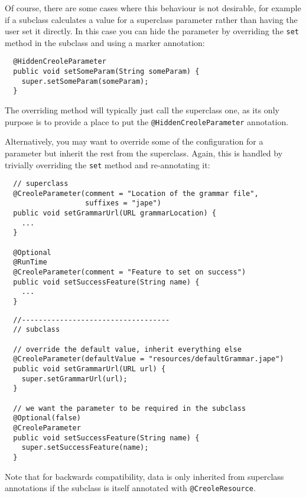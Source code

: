 Of course, there are some cases where this behaviour is not desirable, for
example if a subclass calculates a value for a superclass parameter rather than
having the user set it directly.  In this case you can hide the parameter by
overriding the {\tt set} method in the subclass and using a marker annotation:
\begin{lstlisting}
  @HiddenCreoleParameter
  public void setSomeParam(String someParam) {
    super.setSomeParam(someParam);
  }
\end{lstlisting}

The overriding method will typically just call the superclass one, as its only
purpose is to provide a place to put the \verb|@HiddenCreoleParameter|
annotation.

Alternatively, you may want to override some of the configuration for a
parameter but inherit the rest from the superclass.  Again, this is handled by
trivially overriding the {\tt set} method and re-annotating it:
\begin{lstlisting}
  // superclass
  @CreoleParameter(comment = "Location of the grammar file",
                   suffixes = "jape")
  public void setGrammarUrl(URL grammarLocation) {
    ...
  }

  @Optional
  @RunTime
  @CreoleParameter(comment = "Feature to set on success")
  public void setSuccessFeature(String name) {
    ...
  }
\end{lstlisting}
\begin{lstlisting}
  //-----------------------------------
  // subclass
  
  // override the default value, inherit everything else
  @CreoleParameter(defaultValue = "resources/defaultGrammar.jape")
  public void setGrammarUrl(URL url) {
    super.setGrammarUrl(url);
  }

  // we want the parameter to be required in the subclass
  @Optional(false)
  @CreoleParameter
  public void setSuccessFeature(String name) {
    super.setSuccessFeature(name);
  }
\end{lstlisting}

Note that for backwards compatibility, data is only inherited from superclass
annotations if the subclass is itself annotated with \verb|@CreoleResource|.


